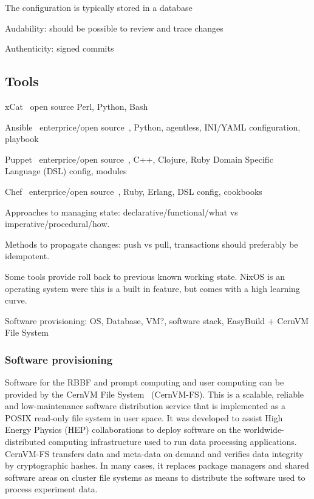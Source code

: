 \documentclass[12pt,a4paper]{article}
\begin{document}
The configuration is typically stored in a database 

Audability: should be possible to review and trace changes

Authenticity: signed commits

\subsection{Tools}


\bitm
\item xCat~\cite{xcat} open source  Perl, Python, Bash
\item Ansible~\cite{ansible} enterprice/open source~\cite{ansible-community}, Python, agentless, INI/YAML configuration, playbook~\cite{ansible-galaxy}
\item Puppet~\cite{puppet} enterprice/open source~\cite{puppet-osp},  C++, Clojure, Ruby Domain Specific Language (DSL) config, modules~\cite{puppet-forge}
\item Chef~\cite{chef} enterprice/open source~\cite{chef-infra}, Ruby, Erlang, DSL config, cookbooks~\cite{chef-cookbooks}
\eitm

Approaches to managing state: declarative/functional/what vs imperative/procedural/how.

Methods to propagate changes: push vs pull, transactions should preferably be idempotent.

Some tools provide roll back to previous known working state. 
NixOS is an operating system were this is a built in feature, but comes with a high learning curve. 


Software provisioning: OS, Database, VM?, software stack, EasyBuild + CernVM File System
\subsubsection{Software provisioning} \label{ssec:software}

Software for the RBBF and prompt computing and user computing can be provided by the CernVM File System~\cite{cernvmfs} (CernVM-FS). 
This is a scalable, reliable and low-maintenance software distribution service that is implemented as a POSIX read-only file system in user space. 
It was developed to assist High Energy Physics (HEP) collaborations to deploy software on the worldwide-distributed computing infrastructure used to run data processing applications. 
CernVM-FS transfers data and meta-data on demand and verifies data integrity by cryptographic hashes.
In many cases, it replaces package managers and shared software areas on cluster file systems as means to distribute the software used to process experiment data. 
\end{document}
